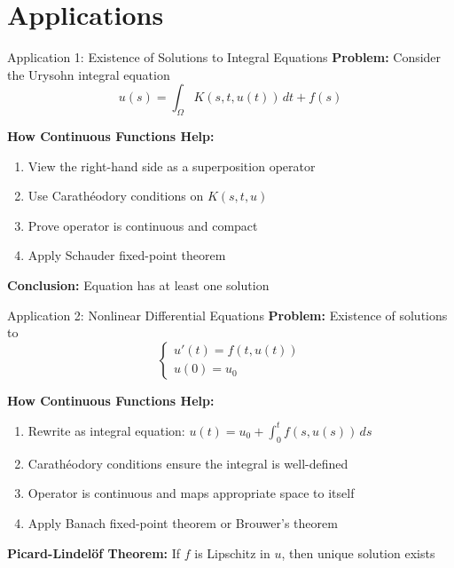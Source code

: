 \documentclass[aspectratio=169,10pt]{beamer}
\begin{document}
\section{Applications}

\begin{frame}{Application 1: Existence of Solutions to Integral Equations}
    \textbf{Problem:} Consider the Urysohn integral equation
    \[
        u(s) = \int_\Omega K(s, t, u(t)) \, dt + f(s)
    \]

    \vspace{0.3cm}
    \textbf{How Continuous Functions Help:}
    \begin{enumerate}
        \item View the right-hand side as a superposition operator
        \item Use Carathéodory conditions on $K(s, t, u)$
        \item Prove operator is continuous and compact
        \item Apply Schauder fixed-point theorem
    \end{enumerate}

    \vspace{0.3cm}
    \textbf{Conclusion:} Equation has at least one solution
\end{frame}

\begin{frame}{Application 2: Nonlinear Differential Equations}
    \textbf{Problem:} Existence of solutions to
    \[
        \begin{cases}
            u'(t) = f(t, u(t)) \\
            u(0) = u_0
        \end{cases}
    \]

    \vspace{0.3cm}
    \textbf{How Continuous Functions Help:}
    \begin{enumerate}
        \item Rewrite as integral equation: $u(t) = u_0 + \int_0^t f(s, u(s)) \, ds$
        \item Carathéodory conditions ensure the integral is well-defined
        \item Operator is continuous and maps appropriate space to itself
        \item Apply Banach fixed-point theorem or Brouwer's theorem
    \end{enumerate}

    \vspace{0.3cm}
    \textbf{Picard-Lindelöf Theorem:} If $f$ is Lipschitz in $u$, then unique solution exists
\end{frame}
\end{document}
